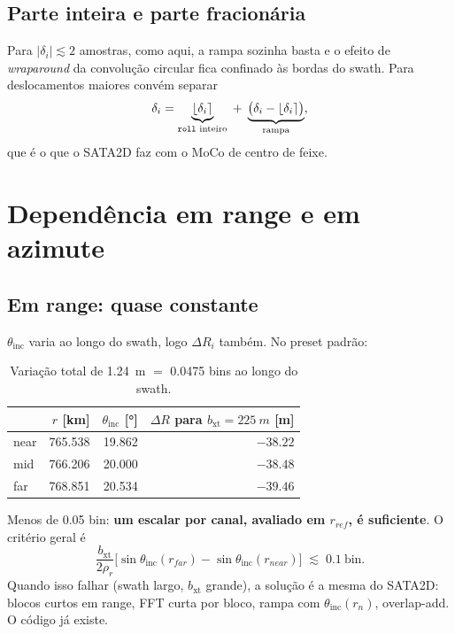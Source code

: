 \documentclass[11pt,a4paper]{article}
\newcommand{\bxt}{b_{\mathrm{xt}}}
\newcommand{\thi}{\theta_{\mathrm{inc}}}
\newcommand{\rhor}{\rho_{r}}
\begin{document}
\subsection{Parte inteira e parte fracionária}

Para $|\delta_i| \lesssim 2$ amostras, como aqui, a rampa sozinha basta e o
efeito de \emph{wraparound} da convolução circular fica confinado às bordas
do swath. Para deslocamentos maiores convém separar
\begin{equation}
\delta_i = \underbrace{\lfloor \delta_i \rceil}_{\text{\texttt{roll} inteiro}}
\;+\; \underbrace{\bigl(\delta_i - \lfloor \delta_i \rceil\bigr)}_{\text{rampa}},
\end{equation}
que é o que o SATA2D faz com o MoCo de centro de feixe.

\section{Dependência em range e em azimute}

\subsection{Em range: quase constante}

$\thi$ varia ao longo do swath, logo $\Delta R_i$ também. No preset padrão:

\begin{table}[h]
\centering
\begin{tabular}{lrrr}
\toprule
& $r$ [km] & $\thi$ [\si{\degree}] & $\Delta R$ para $\bxt=\SI{225}{m}$ [m] \\
\midrule
near  & \num{765.538} & \num{19.862} & $-\num{38.22}$ \\
mid   & \num{766.206} & \num{20.000} & $-\num{38.48}$ \\
far   & \num{768.851} & \num{20.534} & $-\num{39.46}$ \\
\bottomrule
\end{tabular}
\caption{Variação total de \SI{1.24}{m} $=$ \num{0.0475} bins ao longo do
swath.}
\end{table}

\noindent
Menos de \num{0.05} bin: \textbf{um escalar por canal, avaliado em
$r_{ref}$, é suficiente}. O critério geral é
\begin{equation}
\frac{\bxt}{2\rhor}\bigl[\sin\thi(r_{far}) - \sin\thi(r_{near})\bigr]
\;\lesssim\; 0.1 \ \text{bin}.
\end{equation}
Quando isso falhar (swath largo, $\bxt$ grande), a solução é a mesma do
SATA2D: blocos curtos em range, FFT curta por bloco, rampa com
$\thi(r_n)$, overlap-add. O código já existe.
\end{document}
